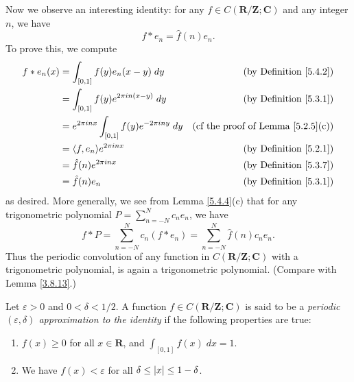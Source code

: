\begin{additional corollary}\label{ac 5.4.1}
Now we observe an interesting identity:
for any \(f \in C(\mathbf{R} / \mathbf{Z} ; \mathbf{C})\) and any integer \(n\), we have
\[
    f * e_n = \hat{f}(n) e_n.
\]
To prove this, we compute
\begin{align*}
    f * e_n(x) & = \int_{[0, 1]} f(y) e_n(x - y) \; dy                        & \text{(by Definition \ref{5.4.2})}            \\
               & = \int_{[0, 1]} f(y) e^{2 \pi i n (x - y)} \; dy             & \text{(by Definition \ref{5.3.1})}            \\
               & = e^{2 \pi i n x} \int_{[0, 1]} f(y) e^{- 2 \pi i n y} \; dy & \text{(cf the proof of Lemma \ref{5.2.5}(c))} \\
               & = \inner*{f, e_n} e^{2 \pi i n x}                            & \text{(by Definition \ref{5.2.1})}            \\
               & = \hat{f}(n) e^{2 \pi i n x}                                 & \text{(by Definition \ref{5.3.7})}            \\
               & = \hat{f}(n) e_n                                             & \text{(by Definition \ref{5.3.1})}
\end{align*}
as desired.
More generally, we see from Lemma \ref{5.4.4}(c) that for any trigonometric polynomial \(P = \sum_{n = -N}^N c_n e_n\), we have
\[
    f * P = \sum_{n = -N}^N c_n (f * e_n) = \sum_{n = -N}^N \hat{f}(n) c_n e_n.
\]
Thus the periodic convolution of any function in \(C(\mathbf{R} / \mathbf{Z} ; \mathbf{C})\) with a trigonometric polynomial, is again a trigonometric polynomial.
(Compare with Lemma \ref{3.8.13}.)
\end{additional corollary}

\begin{definition}\label{5.4.5}
    Let \(\varepsilon > 0\) and \(0 < \delta < 1 / 2\).
    A function \(f \in C(\mathbf{R} / \mathbf{Z} ; \mathbf{C})\) is said to be a \emph{periodic \((\varepsilon, \delta)\) approximation to the identity} if the following properties are true:
    \begin{enumerate}
        \item \(f(x) \geq 0\) for all \(x \in \mathbf{R}\), and \(\int_{[0, 1]} f(x) \; dx = 1\).
        \item We have \(f(x) < \varepsilon\) for all \(\delta \leq \abs*{x} \leq 1 - \delta\).
    \end{enumerate}
\end{definition}

